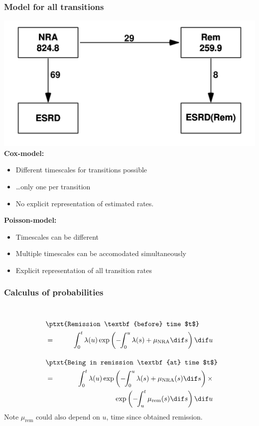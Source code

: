 \begin{frame}
   \frametitle{Model for all transitions}
\begin{minipage}[b]{0.49\textwidth}
\raggedright
\includegraphics[width=\textwidth,keepaspectratio]{NRA-death-ann}\\
\textbf{Cox-model:}
\begin{itemize}
\item Different timescales for transitions possible
\item \ldots only one per transition
\item No explicit representation of estimated rates.
\end{itemize}
\end{minipage}
\hfill
\begin{minipage}[b]{0.49\textwidth}
\raggedright
\textbf{Poisson-model:}
\begin{itemize}
\item Timescales can be different
\item Multiple timescales can be accomodated simultaneously
\item Explicit representation of all transition rates
\end{itemize}
\end{minipage}
\end{frame}

\begin{frame}
   \frametitle{Calculus of probabilities}
\ \\[-3em]
\begin{eqnarray*}
 \lefteqn{ \ptxt{Remission \textbf{before} time $t$} } \\ & = &
 \int_0^t \lambda(u) \exp\left( -\!\! \int_0^u \lambda(s) + \mu_\text{NRA} \dif s
          \right) \dif u\\[1em]
 \lefteqn{ \ptxt{Being in remission \textbf{at} time $t$} } \\ & = &
 \int_0^t \lambda(u) \exp\left( -\!\! \int_0^u \lambda(s) +
                                               \mu_\text{NRA}(s) \dif s \right)
                     \times \\ & & \hspace*{8em}
                     \exp\left( -\!\! \int_u^t \mu_\text{rem}(s) \dif s \right)
          \dif u
\end{eqnarray*}
Note $\mu_\text{rem}$ could also depend on $u$, time since obtained remission.
\end{frame}

